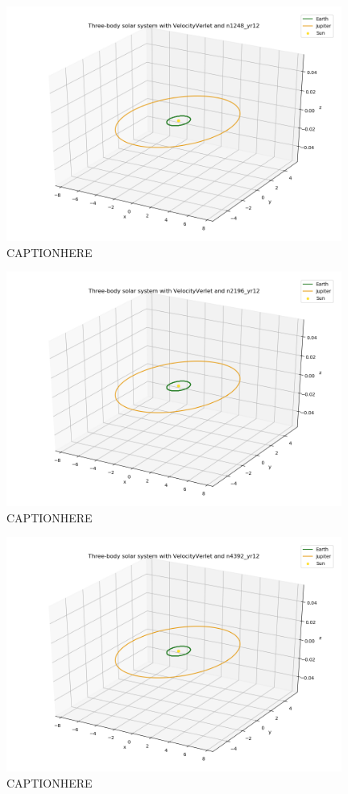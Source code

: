 \documentclass{article}
\begin{document}
    \begin{figure}[H]
        \centering
        \includegraphics[width = 11cm]{img/plot3D_S_E_J_V_n1248_yr12.png}
        \caption{CAPTIONHERE}
        \label{fig:plot3D_S_E_J_V_n1248_yr12}
    \end{figure}

    \begin{figure}[H]
        \centering
        \includegraphics[width = 11cm]{img/plot3D_S_E_J_V_n2196_yr12.png}
        \caption{CAPTIONHERE}
        \label{fig:plot3D_S_E_J_V_n2196_yr12}
    \end{figure}

    \begin{figure}[H]
        \centering
        \includegraphics[width = 11cm]{img/plot3D_S_E_J_V_n4392_yr12.png}
        \caption{CAPTIONHERE}
        \label{fig:plot3D_S_E_J_V_n4392_yr12}
    \end{figure}
\end{document}
